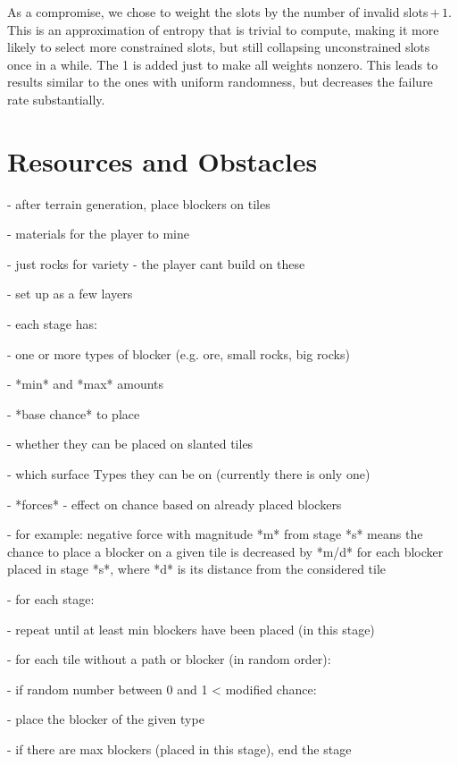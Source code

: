 As a compromise, we chose to weight the slots by the number of invalid slots\,$+\,1$.
This is an approximation of entropy that is trivial to compute, making it more likely to select more constrained slots, but still collapsing unconstrained slots once in a while.
The 1 is added just to make all weights nonzero.
This leads to results similar to the ones with uniform randomness, but decreases the failure rate substantially.



\section{Resources and Obstacles}\label{sec:analysis-obstacles}

- after terrain generation, place blockers on tiles

- materials for the player to mine

- just rocks for variety - the player cant build on these

- set up as a few layers

- each stage has:

- one or more types of blocker (e.g. ore, small rocks, big rocks)

- *min* and *max* amounts

- *base chance* to place

- whether they can be placed on slanted tiles

- which surface Types they can be on (currently there is only one)

- *forces* - effect on chance based on already placed blockers

- for example: negative force with magnitude *m* from stage *s* means the chance to place a blocker on a given tile is decreased by *m/d*  for each blocker placed in stage *s*, where *d* is its distance from the considered tile

- for each stage:

- repeat until at least min blockers have been placed (in this stage)

- for each tile without a path or blocker (in random order):

- if random number between 0 and 1 < modified chance:

- place the blocker of the given type

- if there are max blockers (placed in this stage), end the stage

